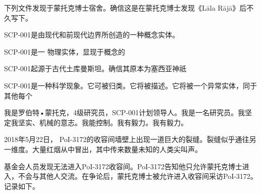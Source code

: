\hr

下列文件发现于蒙托克博士宿舍。确信这是在蒙托克博士发现《Lāla Rājā》后不久写下。

\begin{scpbox}

SCP-001是由现代和前现代边界所创造的一种概念实体。


SCP-001是一 物理实体，显现于概念的


SCP-001起源于古代土库曼斯坦。确信其原本为塞西亚神祇


SCP-001是一种科学现象。它可被归类。它将被描述。它将被一个异常实体，同于其他每个


我是罗伯特•蒙托克，4级研究员，SCP-001计划领导人。我是一名研究员。我坚定我坚实、机械的意志。我能控制。我有毅力。我有毅力。


\end{scpbox}

\hr

2018年5月22日， PoI-3172的收容间墙壁上出现一道巨大的裂缝。裂缝似乎通往另一维度。大量红烟从中冒出，其中传来数量未知的人类尖叫声。

基金会人员发现无法进入PoI-3172收容间。PoI-3172告知他只允许蒙托克博士进入，不会与其他人交流。在争论后，蒙托克博士被允许进入收容间采访PoI-3172。记录如下。

